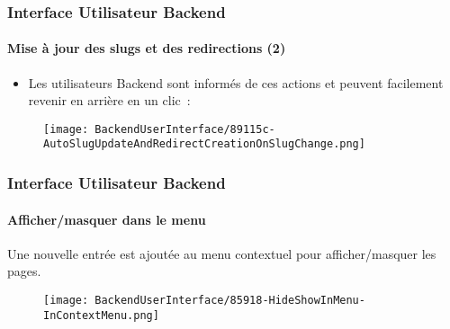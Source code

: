 
\begin{frame}[fragile]
	\frametitle{Interface Utilisateur Backend}
	\framesubtitle{Mise à jour des slugs et des redirections (2)}

	\begin{itemize}
		\item Les utilisateurs Backend sont informés de ces actions et peuvent
			facilement revenir en arrière en un clic~:

	\end{itemize}

	\begin{figure}
		\texttt{[image: BackendUserInterface/89115c-AutoSlugUpdateAndRedirectCreationOnSlugChange.png]}
	\end{figure}

\end{frame}


\begin{frame}[fragile]
	\frametitle{Interface Utilisateur Backend}
	\framesubtitle{Afficher/masquer dans le menu}

	Une nouvelle entrée est ajoutée au menu contextuel pour afficher/masquer les pages.

	\begin{figure}
		\texttt{[image: BackendUserInterface/85918-HideShowInMenu-InContextMenu.png]}
	\end{figure}

\end{frame}


